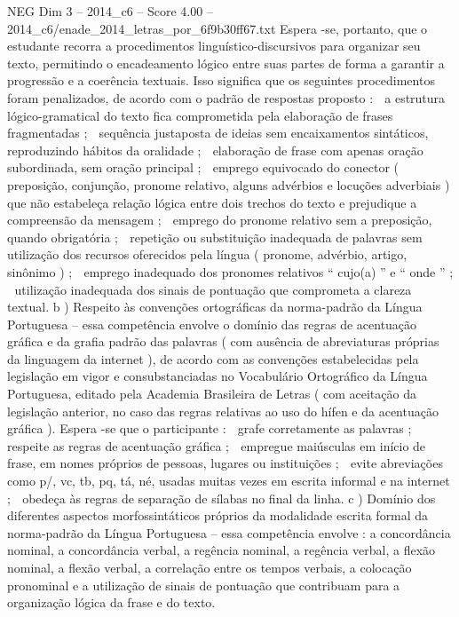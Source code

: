 \begin{textsample}{NEG Dim 3 – 2014\_c6 – Score 4.00 – 2014\_c6/enade\_2014\_letras\_por\_6f9b30ff67.txt}
Espera -se, portanto, que o estudante recorra a procedimentos linguístico-discursivos para organizar seu texto, permitindo o encadeamento lógico entre suas partes de forma a garantir a progressão e a coerência textuais.
Isso significa que os seguintes procedimentos foram penalizados, de acordo com o padrão de respostas proposto :  a estrutura lógico-gramatical do texto fica comprometida pela elaboração de frases fragmentadas ;  sequência justaposta de ideias sem encaixamentos sintáticos, reproduzindo hábitos da oralidade ;  elaboração de frase com apenas oração subordinada, sem oração principal ;  emprego equivocado do conector ( preposição, conjunção, pronome relativo, alguns advérbios e locuções adverbiais ) que não estabeleça relação lógica entre dois trechos do texto e prejudique a compreensão da mensagem ;  emprego do pronome relativo sem a preposição, quando obrigatória ;  repetição ou substituição inadequada de palavras sem utilização dos recursos oferecidos pela língua ( pronome, advérbio, artigo, sinônimo ) ;  emprego inadequado dos pronomes relativos “ cujo(a) ” e “ onde ” ;  utilização inadequada dos sinais de pontuação que comprometa a clareza textual. b ) Respeito às convenções ortográficas da norma-padrão da Língua Portuguesa – essa competência envolve o domínio das regras de acentuação gráfica e da grafia padrão das palavras ( com ausência de abreviaturas próprias da linguagem da internet ), de acordo com as convenções estabelecidas pela legislação em vigor e consubstanciadas no Vocabulário Ortográfico da Língua Portuguesa, editado pela Academia Brasileira de Letras ( com aceitação da legislação anterior, no caso das regras relativas ao uso do hífen e da acentuação gráfica ).
Espera -se que o participante :  grafe corretamente as palavras ;  respeite as regras de acentuação gráfica ;  empregue maiúsculas em início de frase, em nomes próprios de pessoas, lugares ou instituições ;  evite abreviações como p/, vc, tb, pq, tá, né, usadas muitas vezes em escrita informal e na internet ;  obedeça às regras de separação de sílabas no final da linha. c ) Domínio dos diferentes aspectos morfossintáticos próprios da modalidade escrita formal da norma-padrão da Língua Portuguesa – essa competência envolve : a concordância nominal, a concordância verbal, a regência nominal, a regência verbal, a flexão nominal, a flexão verbal, a correlação entre os tempos verbais, a colocação pronominal e a utilização de sinais de pontuação que contribuam para a organização lógica da frase e do texto.

\end{textsample}
